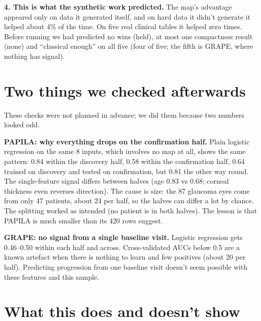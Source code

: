 \documentclass[11pt]{article}
\begin{document}
\textbf{4. This is what the synthetic work predicted.} The map's advantage appeared only on data it generated
itself, and on hard data it didn't generate it helped about 4\% of the time. On five real clinical tables it
helped zero times. Before running we had predicted no wins (held), at most one compactness result (none) and
``classical enough'' on all five (four of five; the fifth is GRAPE, where nothing has signal).

\section{Two things we checked afterwards}

These checks were not planned in advance; we did them because two numbers looked odd.

\textbf{PAPILA: why everything drops on the confirmation half.} Plain logistic regression on the same 8 inputs,
which involves no map at all, shows the same pattern: 0.84 within the discovery half, 0.58 within the
confirmation half, 0.64 trained on discovery and tested on confirmation, but 0.81 the other way round. The
single-feature signal differs between halves (age 0.83 vs 0.68; corneal thickness even reverses direction).
The cause is size: the 87 glaucoma eyes come from only 47 patients, about 24 per half, so the halves can differ
a lot by chance. The splitting worked as intended (no patient is in both halves). The lesson is that PAPILA
is much smaller than its 420 rows suggest.

\textbf{GRAPE: no signal from a single baseline visit.} Logistic regression gets 0.46--0.50 within each half
and across. Cross-validated AUCs below 0.5 are a known artefact when there is nothing to learn and few
positives (about 20 per half). Predicting progression from one baseline visit doesn't seem possible with
these features and this sample.

\section{What this does and doesn't show}
\end{document}
